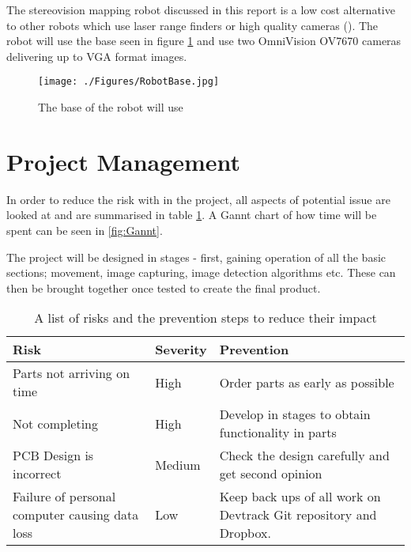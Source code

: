 The stereovision mapping robot discussed in this report is a low cost alternative to other robots which use laser range finders or high quality cameras (\cite{Se:MappingRobot}). The robot will use the base seen in figure \ref{fig:RobotBase} and use two OmniVision OV7670 cameras delivering up to VGA format images.

\begin{figure}
\texttt{[image: ./Figures/RobotBase.jpg]}
\caption{The base of the robot will use}
\label{fig:RobotBase}
\end{figure}

\section{Project Management}
In order to reduce the risk with in the project, all aspects of potential issue are looked at and are summarised in table \ref{tab:risk}. A Gannt chart of how time will be spent can be seen in \ref{fig:Gannt}. 

The project will be designed in stages - first, gaining operation of all the basic sections; movement, image capturing, image detection algorithms etc. These can then be brought together once tested to create the final product. 
\begin{table}
\begin{tabular}{|p{6cm}|p{2cm}|p{6cm}|}\hline
Risk						&	Severity	&	Prevention \\ \hline
Parts not arriving on time	&	High		&	Order parts as early as possible \\
Not completing				&	High		&	Develop in stages to obtain functionality in parts	\\
PCB Design is incorrect		&	Medium		&	Check the design carefully and get second opinion \\
Failure of personal computer causing data loss & Low	& 	Keep back ups of all work on Devtrack Git repository and Dropbox.\\

\hline
\end{tabular}
\caption{A list of risks and the prevention steps to reduce their impact}
\label{tab:risk}
\end{table}
